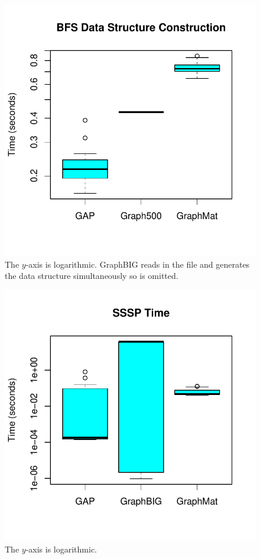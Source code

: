 \documentclass[conference]{IEEEtran}
\begin{document}
\begin{figure}
	\centering
	\includegraphics[width=0.8\columnwidth]{graphics/bfs_dsc.pdf}
	\vspace{-18pt}
	\caption{The $y$-axis is logarithmic. GraphBIG reads in the file and generates the data structure simultaneously so is omitted.}
	\label{fig:bfs-dsc}
\end{figure}

\begin{figure}
	\centering
	\includegraphics[width=0.8\columnwidth]{graphics/sssp_time.pdf}
	\vspace{-18pt}
	\caption{The $y$-axis is logarithmic.}
	\label{fig:sssp-time}
\end{figure}
\end{document}
